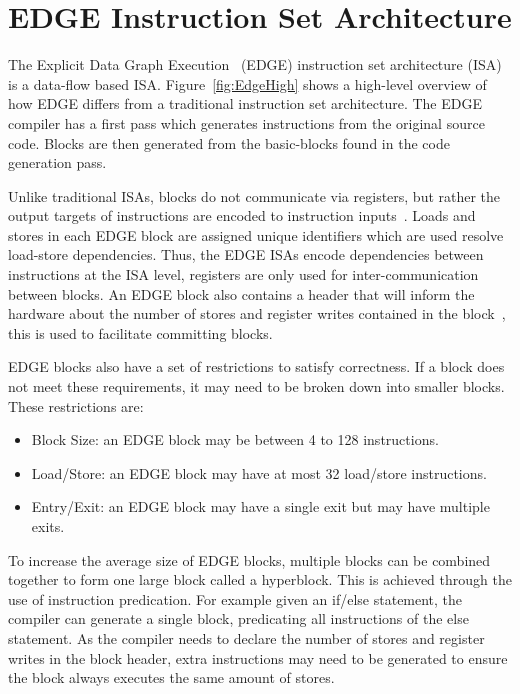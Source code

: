 \section{EDGE Instruction Set Architecture} 
The Explicit Data Graph Execution~\cite{burger04edge} (EDGE) instruction set architecture (ISA) is a data-flow based ISA.
Figure~\ref{fig:EdgeHigh} shows a high-level overview of how EDGE differs from a traditional instruction set architecture.
The EDGE compiler has a first pass which generates instructions from the original source code.
Blocks are then generated from the basic-blocks found in the code generation pass.

Unlike traditional ISAs, blocks do not communicate via registers, but rather the output targets of instructions are encoded to instruction inputs~\cite{smith2006edge}.
Loads and stores in each EDGE block are assigned unique identifiers which are used resolve load-store dependencies.
Thus, the EDGE ISAs encode dependencies between instructions at the ISA level, registers are only used for inter-communication between blocks.
An EDGE block also contains a header that will inform the hardware about the number of stores and register writes contained in the block~\cite{e2paper}, this is used to facilitate committing blocks.

EDGE blocks also have a set of restrictions to satisfy correctness.
If a block does not meet these requirements, it may need to be broken down into smaller blocks.
These restrictions are:

\begin{itemize}
\item Block Size: an EDGE block may be between 4 to 128 instructions.
\item Load/Store: an EDGE block may have at most 32 load/store instructions.
\item Entry/Exit: an EDGE block may have a single exit but may have multiple exits.
\end{itemize}

To increase the average size of EDGE blocks, multiple blocks can be combined together to form one large block called a hyperblock.
This is achieved through the use of instruction predication.
For example given an if/else statement, the compiler can generate a single block, predicating all instructions of the else statement.
As the compiler needs to declare the number of stores and register writes in the block header, extra instructions may need to be generated to ensure the block always executes the same amount of stores.

